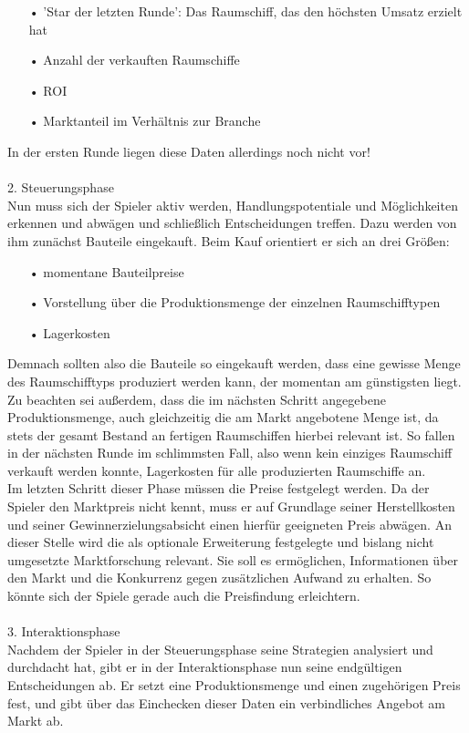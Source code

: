 \begin{itemize}
\item[•] 'Star der letzten Runde': Das Raumschiff, das den höchsten Umsatz erzielt hat
\item[•] Anzahl der verkauften Raumschiffe
\item[•] ROI
\item[•] Marktanteil im Verhältnis zur Branche
\end{itemize}

In der ersten Runde liegen diese Daten allerdings noch nicht vor! 
\\
\\
{\Large 2. Steuerungsphase}
\\
Nun muss sich der Spieler aktiv werden, Handlungspotentiale und Möglichkeiten erkennen und abwägen und schließlich Entscheidungen treffen. Dazu werden von ihm zunächst Bauteile eingekauft. Beim Kauf orientiert er sich an drei Größen: 

\begin{itemize}
\item[•] momentane Bauteilpreise
\item[•] Vorstellung über die Produktionsmenge der einzelnen Raumschifftypen
\item[•] Lagerkosten 
\end{itemize}

Demnach sollten also die Bauteile so eingekauft werden, dass eine gewisse Menge des Raumschifftyps produziert werden kann, der momentan am günstigsten liegt. Zu beachten sei außerdem, dass die im nächsten Schritt angegebene Produktionsmenge, auch gleichzeitig die am Markt angebotene Menge ist, da stets der gesamt Bestand an fertigen Raumschiffen hierbei relevant ist. So fallen in der nächsten Runde im schlimmsten Fall, also wenn kein einziges Raumschiff verkauft werden konnte, Lagerkosten für alle produzierten Raumschiffe an.  
\\
Im letzten Schritt dieser Phase müssen die Preise festgelegt werden. Da der Spieler den Marktpreis nicht kennt, muss er auf Grundlage seiner Herstellkosten und seiner Gewinnerzielungsabsicht einen hierfür geeigneten Preis abwägen. An dieser Stelle wird die als optionale Erweiterung festgelegte und bislang nicht umgesetzte Marktforschung relevant.  Sie soll es ermöglichen, Informationen über den Markt und die Konkurrenz gegen zusätzlichen Aufwand zu erhalten. So könnte sich der Spiele gerade auch die Preisfindung erleichtern. 
\\
\\
{\Large 3. Interaktionsphase}
\\
Nachdem der Spieler in der Steuerungsphase seine Strategien analysiert und durchdacht hat, gibt er in der Interaktionsphase nun seine endgültigen Entscheidungen ab. Er setzt eine Produktionsmenge und einen zugehörigen Preis fest, und gibt über das Einchecken dieser Daten ein verbindliches Angebot am Markt ab. 




